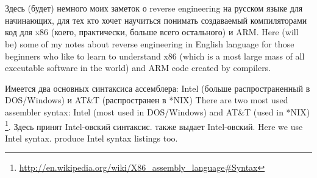 ﻿\chapter{}

\IFRU
{Здесь (будет) немного моих заметок о reverse engineering на русском языке для начинающих, 
для тех кто хочет научиться понимать создаваемый \CCpp компиляторами код для x86 (коего, 
практически, больше всего остального) и ARM.}
{Here (will be) some of my notes about reverse engineering in English language for 
those beginners who like to learn to understand x86 (which is a most large mass of 
all executable software in the world) and ARM code created by \CCpp compilers.}


\IFRU
{Имеется два основных синтаксиса ассемблера: Intel (больше распространенный в DOS/Windows) и 
AT\&T (распространен в *NIX)}
{There are two most used assembler syntax: Intel (most used in DOS/Windows) and AT\&T (used in *NIX)}
\footnote{\url{http://en.wikipedia.org/wiki/X86_assembly_language\#Syntax}}. 
\IFRU
{Здесь принят Intel-овский синтаксис. \IDA также выдает Intel-овский.}
{Here we use Intel syntax. \IDA produce Intel syntax listings too.}
